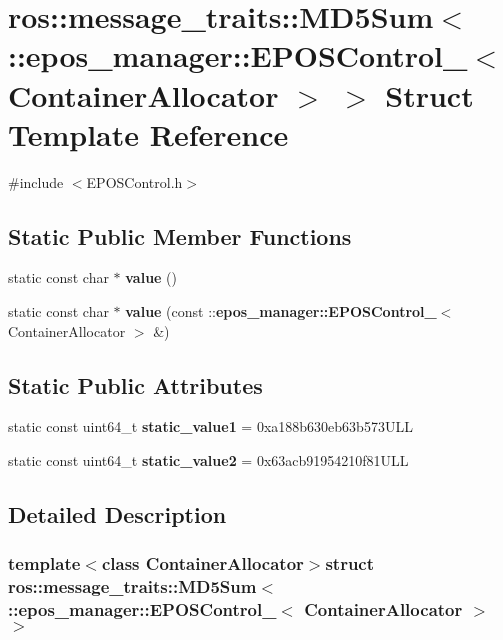 \section{ros\-:\-:message\-\_\-traits\-:\-:\-M\-D5\-Sum$<$ \-:\-:epos\-\_\-manager\-:\-:\-E\-P\-O\-S\-Control\-\_\-$<$ \-Container\-Allocator $>$ $>$ \-Struct \-Template \-Reference}
\label{structros_1_1message__traits_1_1MD5Sum_3_01_1_1epos__manager_1_1EPOSControl___3_01ContainerAllocator_01_4_01_4}


{\ttfamily \#include $<$\-E\-P\-O\-S\-Control.\-h$>$}

\subsection*{\-Static \-Public \-Member \-Functions}
\begin{DoxyCompactItemize}
\item 
static const char $\ast$ {\bf value} ()
\item 
static const char $\ast$ {\bf value} (const \-::{\bf epos\-\_\-manager\-::\-E\-P\-O\-S\-Control\-\_\-}$<$ \-Container\-Allocator $>$ \&)
\end{DoxyCompactItemize}
\subsection*{\-Static \-Public \-Attributes}
\begin{DoxyCompactItemize}
\item 
static const uint64\-\_\-t {\bf static\-\_\-value1} = 0xa188b630eb63b573\-U\-L\-L
\item 
static const uint64\-\_\-t {\bf static\-\_\-value2} = 0x63acb91954210f81\-U\-L\-L
\end{DoxyCompactItemize}


\subsection{\-Detailed \-Description}
\subsubsection*{template$<$class Container\-Allocator$>$struct ros\-::message\-\_\-traits\-::\-M\-D5\-Sum$<$ \-::epos\-\_\-manager\-::\-E\-P\-O\-S\-Control\-\_\-$<$ Container\-Allocator $>$ $>$}



